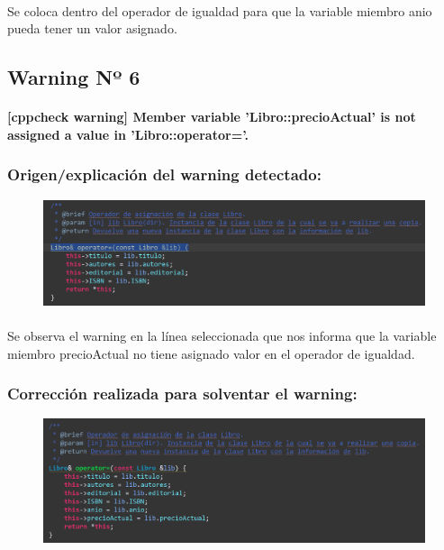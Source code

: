 			\paragraph{}Se coloca dentro del operador de igualdad para que la variable miembro anio pueda tener un valor asignado.
			
	\subsection{Warning Nº 6}
	
		\paragraph{[cppcheck warning] Member variable 'Libro::precioActual' is not assigned a value in 'Libro::operator='.}
	
		\subsubsection{Origen/explicación del warning detectado:}
		
			\begin{figure}[H]
				\centering
				\includegraphics[scale=0.55]{img/esteban4.png}
				\label{esteban4}
			\end{figure}
		
			\paragraph{}Se observa el warning en la línea seleccionada que nos informa que la variable miembro precioActual no tiene asignado valor en el operador de igualdad.
			
		\subsubsection{Corrección realizada para solventar el warning:}
		
			\begin{figure}[H]
				\centering
				\includegraphics[scale=0.55]{img/esteban5.png}
				\label{esteban5}
			\end{figure}
		
